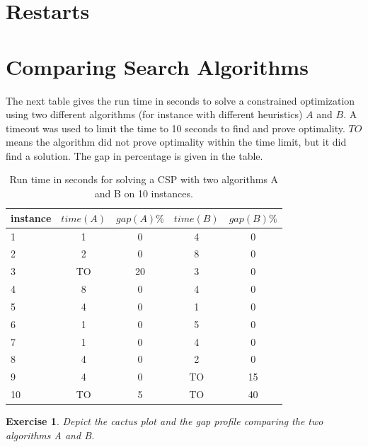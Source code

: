 \documentclass{article}
\newtheorem{exercise}{Exercise}[section]
\begin{document}
    \section{Restarts}

    \section{Comparing Search Algorithms}

    The next table gives the run time in seconds to solve a constrained optimization using
    two different algorithms (for instance with different heuristics) $A$ and $B$.
    A timeout was used to limit the time to 10 seconds to find and prove optimality.
    $TO$ means the algorithm did not prove optimality within the time limit, but it did find a solution.
    The gap in percentage is given in the table.

    \begin{table}[htbp]
        \centering
        \begin{tabular}{|l|c|c||c|c|}
            \hline
            instance & $time(A)$ & $gap(A)\%$ & $time(B)$ & $gap(B)\%$  \\
            \hline
            1 & 1 & 0 & 4 & 0\\
            2 & 2 & 0 & 8 & 0 \\
            3 & TO & 20 & 3 & 0\\
            4 & 8 & 0 & 4 & 0 \\
            5 & 4 & 0 & 1 & 0 \\
            6 & 1 & 0 & 5 & 0 \\
            7 & 1 & 0 & 4 & 0 \\
            8 & 4 & 0 & 2 & 0 \\
            9 & 4 & 0 & TO & 15 \\
            10 & TO & 5 & TO & 40 \\
            \hline
        \end{tabular}
        \caption{Run time in seconds for solving a CSP with two algorithms A and B on 10 instances.}
        \label{tab:algorithms}
    \end{table}

    \begin{exercise}
        Depict the cactus plot and the gap profile comparing the two algorithms A and B.
        \begin{center}
        \end{center}
    \end{exercise}
\end{document}
